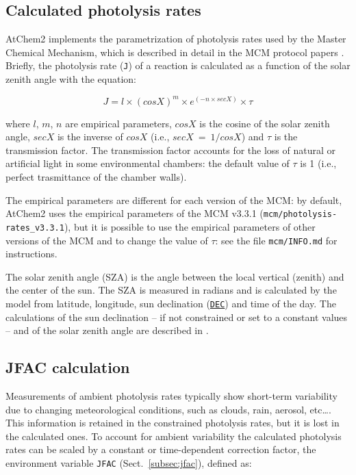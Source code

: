 \subsection{Calculated photolysis rates} \label{subsec:calculated-photolysis-rates}

AtChem2 implements the parametrization of photolysis rates used by the
Master Chemical Mechanism, which is described in detail in the MCM
protocol papers \citep{jenkin_1997, saunders_2003}. Briefly, the
photolysis rate (\texttt{J}) of a reaction is calculated as a function
of the solar zenith angle with the equation:

\begin{equation}
  J = l \times (cosX)^m \times e^{(-n \times secX)} \times \tau
\end{equation}

where $l$, $m$, $n$ are empirical parameters,
$cosX$ is the cosine of the solar zenith angle, $secX$
is the inverse of $cosX$ (i.e., $secX\ =\ 1/cosX$) and
$\tau$ is the transmission factor. The transmission factor
accounts for the loss of natural or artificial light in some
environmental chambers: the default value of $\tau$ is 1 (i.e.,
perfect trasmittance of the chamber walls).

The empirical parameters are different for each version of the MCM: by
default, AtChem2 uses the empirical parameters of the MCM v3.3.1
(\texttt{mcm/photolysis-rates\_v3.3.1}), but it is possible to use the
empirical parameters of other versions of the MCM and to change the
value of $\tau$: see the file \texttt{mcm/INFO.md} for instructions.

The solar zenith angle (SZA) is the angle between the local vertical
(zenith) and the center of the sun. The SZA is measured in radians and
is calculated by the model from latitude, longitude, sun declination
(\hyperref[subsec:dec]{\texttt{DEC}}) and time of the day. The
calculations of the sun declination -- if not constrained or set to a
constant values -- and of the solar zenith angle are described in
\citet{madronich_1993}.

\subsection{JFAC calculation} \label{subsec:jfac-calculation}

Measurements of ambient photolysis rates typically show short-term
variability due to changing meteorological conditions, such as clouds,
rain, aerosol, etc\ldots \citep{sommariva_2020}. This information is
retained in the constrained photolysis rates, but it is lost in the
calculated ones. To account for ambient variability the calculated
photolysis rates can be scaled by a constant or time-dependent
correction factor, the environment variable \texttt{JFAC}
(Sect.~\ref{subsec:jfac}), defined as:

